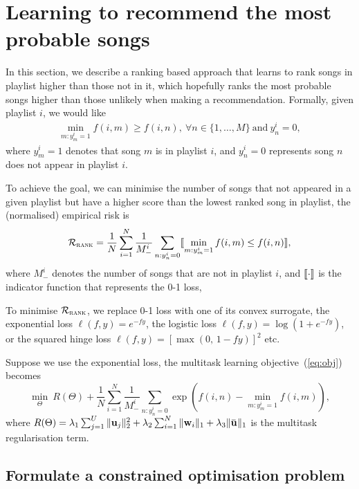 \section{Learning to recommend the most probable songs}

In this section, we describe a ranking based approach that learns to rank songs in playlist higher 
than those not in it, which hopefully ranks the most probable songs higher than those unlikely when making a recommendation.
Formally, given playlist $i$, we would like
\begin{equation*}
\begin{aligned}
\min_{m: y_m^i = 1} f(i, m) \ge f(i, n), \ \forall n \in \{1,\dots,M\} \ \text{and} \ y_n^i = 0,
\end{aligned}
\end{equation*}
where $y_m^i = 1$ denotes that song $m$ is in playlist $i$,
and $y_n^i = 0$ represents song $n$ does not appear in playlist $i$.

To achieve the goal, we can minimise the number of songs that not appeared in a given playlist
but have a higher score than the lowest ranked song in playlist, \ie the (normalised) empirical risk is
\begin{equation}
\label{eq:bp}
\mathcal{R}_\textsc{rank} = \frac{1}{N} \sum_{i=1}^N \frac{1}{M_-^i} \sum_{n: y_n^i = 0} \llbracket \min_{m: y_m^i = 1} f(i, m) \le f(i, n) \rrbracket,
\end{equation}
where $M_-^i$ denotes the number of songs that are not in playlist $i$,
and $\llbracket \cdot \rrbracket$ is the indicator function that represents the 0-1 loss,

To minimise $\mathcal{R}_\textsc{rank}$, we replace 0-1 loss with one of its convex surrogate,
\eg the exponential loss $\ell(f, y) = e^{-fy}$, the logistic loss $\ell(f, y) = \log(1 + e^{-fy})$,
or the squared hinge loss $\ell(f, y) = [\max(0, \, 1 - fy)]^2$ etc.

Suppose we use the exponential loss, the multitask learning objective~(\ref{eq:obj}) becomes
\begin{equation}
\label{eq:expobj}
\min_{\Theta} \ R(\Theta) + \frac{1}{N} \sum_{i=1}^N \frac{1}{M_-^i} \sum_{n: y_n^i = 0} \exp \left(f(i, n) - \min_{m: y_m^i = 1} f(i, m) \right),
\end{equation}
where $R(\Theta) = \lambda_1 \sum_{j=1}^U \|\bu_j\|_2^2 + \lambda_2 \sum_{i=1}^N \|\w_i\|_1 + \lambda_3 \|\widebar\bu\|_1$ 
is the multitask regularisation term.



\subsection{Formulate a constrained optimisation problem}

